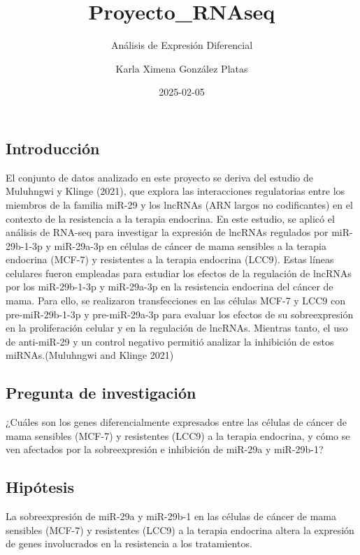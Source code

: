 \documentclass[
]{article}
\title{Proyecto\_RNAseq}
\subtitle{Análisis de Expresión Diferencial}
\author{Karla Ximena González Platas}
\date{2025-02-05}
\begin{document}
\maketitle

{
\setcounter{tocdepth}{2}
\tableofcontents
}
\subsection{Introducción}\label{introducciuxf3n}

El conjunto de datos analizado en este proyecto se deriva del estudio de
Muluhngwi y Klinge (2021), que explora las interacciones regulatorias
entre los miembros de la familia miR-29 y los lncRNAs (ARN largos no
codificantes) en el contexto de la resistencia a la terapia endocrina.
En este estudio, se aplicó el análisis de RNA-seq para investigar la
expresión de lncRNAs regulados por miR-29b-1-3p y miR-29a-3p en células
de cáncer de mama sensibles a la terapia endocrina (MCF-7) y resistentes
a la terapia endocrina (LCC9). Estas líneas celulares fueron empleadas
para estudiar los efectos de la regulación de lncRNAs por los
miR-29b-1-3p y miR-29a-3p en la resistencia endocrina del cáncer de
mama. Para ello, se realizaron transfecciones en las células MCF-7 y
LCC9 con pre-miR-29b-1-3p y pre-miR-29a-3p para evaluar los efectos de
su sobreexpresión en la proliferación celular y en la regulación de
lncRNAs. Mientras tanto, el uso de anti-miR-29 y un control negativo
permitió analizar la inhibición de estos miRNAs.(Muluhngwi and Klinge
2021)

\subsection{Pregunta de
investigación}\label{pregunta-de-investigaciuxf3n}

¿Cuáles son los genes diferencialmente expresados entre las células de
cáncer de mama sensibles (MCF-7) y resistentes (LCC9) a la terapia
endocrina, y cómo se ven afectados por la sobreexpresión e inhibición de
miR-29a y miR-29b-1?

\subsection{Hipótesis}\label{hipuxf3tesis}

La sobreexpresión de miR-29a y miR-29b-1 en las células de cáncer de
mama sensibles (MCF-7) y resistentes (LCC9) a la terapia endocrina
altera la expresión de genes involucrados en la resistencia a los
tratamientos.
\end{document}
